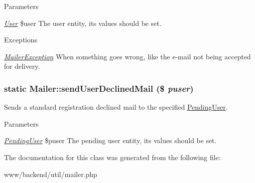 \begin{DoxyParams}{Parameters}
\item[{\em \hyperlink{classUser}{User}}]\$user The user entity, its values should be set. \end{DoxyParams}

\begin{DoxyExceptions}{Exceptions}
\item[{\em \hyperlink{classMailerException}{MailerException}}]When something goes wrong, like the e-\/mail not being accepted for delivery. \end{DoxyExceptions}
\hypertarget{classMailer_a44f0dba87089ce36ee3faba019958ffe}{
\subsubsection[{sendUserDeclinedMail}]{\setlength{\rightskip}{0pt plus 5cm}static Mailer::sendUserDeclinedMail (\$ {\em puser})}}
\label{classMailer_a44f0dba87089ce36ee3faba019958ffe}
Sends a standard registration declined mail to the specified \hyperlink{classPendingUser}{PendingUser}.


\begin{DoxyParams}{Parameters}
\item[{\em \hyperlink{classPendingUser}{PendingUser}}]\$puser The pending user entity, its values should be set. \end{DoxyParams}


The documentation for this class was generated from the following file:\begin{DoxyCompactItemize}
\item 
www/backend/util/mailer.php\end{DoxyCompactItemize}
